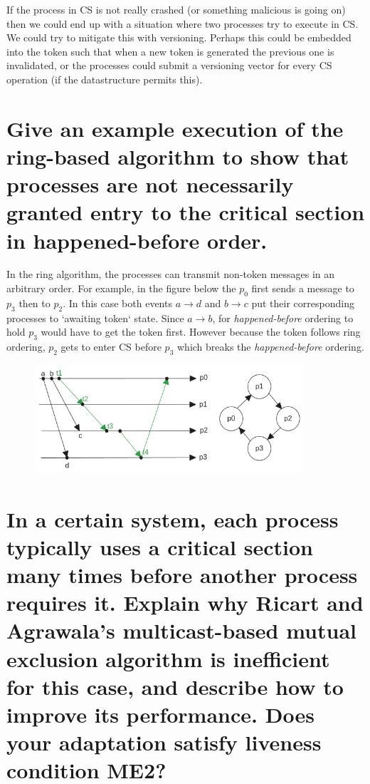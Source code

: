 \documentclass{article}
\begin{document}
If the process in CS is not really crashed (or something malicious is going on) then we could end up with a situation where two
processes try to execute in CS. We could try to mitigate this with versioning. Perhaps this could be embedded into the token such that
when a new token is generated the previous one is invalidated, or the processes could submit a versioning vector for every CS operation (if the datastructure permits this).

\section{Give an example execution of the ring-based algorithm to show that processes are not
necessarily granted entry to the critical section in happened-before order.}

In the ring algorithm, the processes can transmit non-token messages in an arbitrary order. For example, in the figure below the $p_0$ first sends a message to $p_3$ then to
$p_2$. In this case both events $a \rightarrow d$ and $b \rightarrow c$ put their corresponding processes to `awaiting token` state. Since $a \rightarrow b$, for \textit{happened-before} ordering to hold $p_3$ would have to get the token first.
However because the token follows ring ordering, $p_2$ gets to enter CS before $p_3$ which breaks the \textit{happened-before} ordering.

\begin{figure}[H]
    \centering
    \includegraphics[width=10cm]{ring_algorithm.png}
    \caption{}
\end{figure}
  

\section{In a certain system, each process typically uses a critical section many times before
another process requires it. Explain why Ricart and Agrawala’s multicast-based mutual
exclusion algorithm is inefficient for this case, and describe how to improve its
performance. Does your adaptation satisfy liveness condition ME2?}
\end{document}
